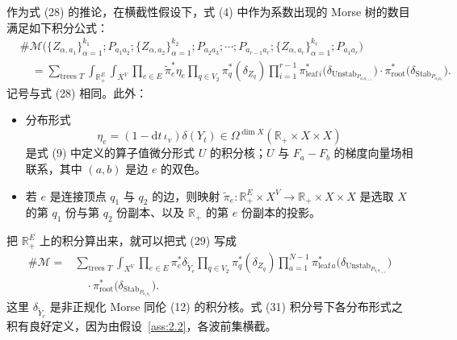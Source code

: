 作为式 (28) 的推论，在横截性假设下，式 (4) 中作为系数出现的 Morse 树的数目满足如下积分公式：
\begin{equation}\tag{29}\label{eq:29}
\begin{aligned}
  &\#\mathcal M\bigl(\{Z_{\alpha,a_1}\}_{\alpha=1}^{k_1};P_{a_1a_2};
  \{Z_{\alpha,a_2}\}_{\alpha=1}^{k_2};P_{a_2a_3};\cdots;
  P_{a_{r-1}a_r};\{Z_{\alpha,a_r}\}_{\alpha=1}^{k_r};P_{a_1a_r}\bigr)\\
  &\quad=\sum_{\text{trees }T}\int_{\mathbb R_+^E}\int_{X^V}
  \prod_{e\in E}\widetilde\pi_e^*\eta_e
  \prod_{q\in V_2}\pi_q^*(\delta_{Z_q})
  \prod_{i=1}^{r-1}\pi_{\mathrm{leaf}\,i}^*
  \bigl(\delta_{\mathrm{Unstab}_{P_{a_ia_{i+1}}}}\bigr)
  \cdot\pi_{\mathrm{root}}^*\bigl(\delta_{\mathrm{Stab}_{P_{a_1a_r}}}\bigr).
\end{aligned}
\end{equation}
记号与式 (28) 相同。此外：

\begin{itemize}
  \item 分布形式
  \begin{equation}\tag{30}\label{eq:30}
    \eta_e=(1-\mathrm{d}t\,\iota_v)\delta(Y_t)\in\Omega^{\dim X}(\mathbb R_+\times X\times X)
  \end{equation}
  是式 (9) 中定义的算子值微分形式 $U$ 的积分核；$U$ 与 $F_a-F_b$ 的梯度向量场相联系，其中 $(a,b)$ 是边 $e$ 的双色。
  \item 若 $e$ 是连接顶点 $q_1$ 与 $q_2$ 的边，则映射 $\widetilde\pi_e\colon\mathbb R_+^E\times X^V\to\mathbb R_+\times X\times X$ 是选取 $X$ 的第 $q_1$ 份与第 $q_2$ 份副本、以及 $\mathbb R_+$ 的第 $e$ 份副本的投影。
\end{itemize}

把 $\mathbb R_+^E$ 上的积分算出来，就可以把式 (29) 写成
\begin{equation}\tag{31}\label{eq:31}
\begin{aligned}
  \#\mathcal M={}&\sum_{\text{trees }T}\int_{X^V}
  \prod_{e\in E}\pi_e^*\delta_{\widetilde Y_e}
  \prod_{q\in V_2}\pi_q^*(\delta_{Z_q})
  \prod_{a=1}^{N-1}\pi_{\mathrm{leaf}\,a}^*
  \bigl(\delta_{\mathrm{Unstab}_{P_{a_ia_{i+1}}}}\bigr)\\
  &\quad\cdot\pi_{\mathrm{root}}^*\bigl(\delta_{\mathrm{Stab}_{P_{a_1a_r}}}\bigr).
\end{aligned}
\end{equation}
这里 $\delta_{\widetilde Y_e}$ 是非正规化 Morse 同伦 (12) 的积分核。式 (31) 积分号下各分布形式之积有良好定义，因为由假设~\ref{ass:2.2}，各波前集横截。



\endinput
